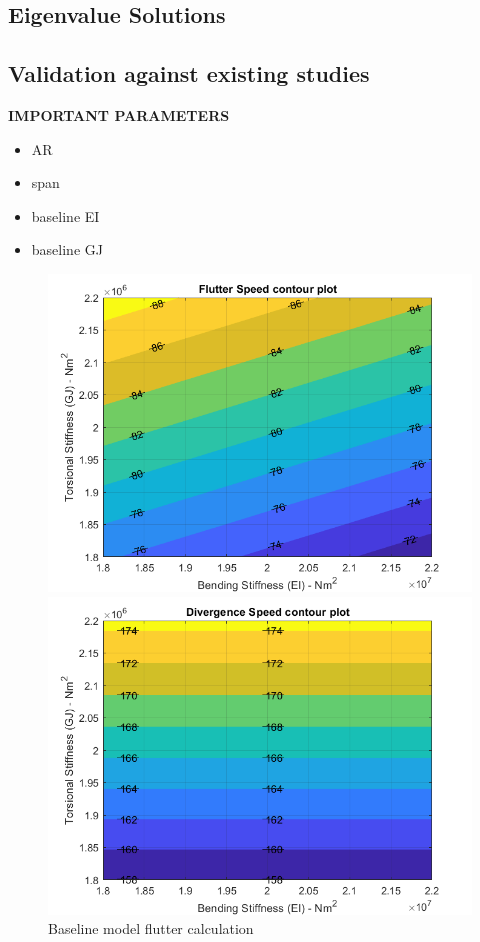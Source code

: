 \documentclass[11pt]{article}
\begin{document}
\subsection{Eigenvalue Solutions}

\subsection{Validation against existing studies}
\textbf{IMPORTANT PARAMETERS}
\begin{itemize}
    \item AR
    \item span
    \item baseline EI
    \item baseline GJ
\end{itemize}

\begin{figure}[!hbt]
    \begin{minipage}{.5\textwidth}
    \centering
    \includegraphics[width = \textwidth]{figures/CooperandWright_flutter.png}
    \caption{Baseline model flutter calculation}
    \label{fig:JandJ-flutter}
    \end{minipage}%
    \begin{minipage}{.5\textwidth}
    \centering
    \includegraphics[width = \textwidth]{figures/CooperandWright_divergence.png}

\end{minipage}
\end{figure}
\end{document}
